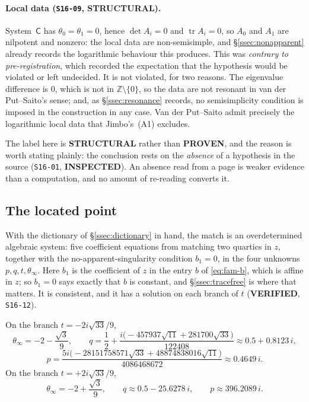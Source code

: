 \paragraph{Local data (\texttt{S16-09}, \textbf{STRUCTURAL}).}
System~$\mathsf C$ has $\theta_0=\theta_1=0$, hence $\det A_i=0$ and
$\operatorname{tr}A_i=0$, so $A_0$ and $A_1$ are nilpotent and nonzero: the
local data are non-semisimple, and \S\ref{ssec:nonapparent} already records the
logarithmic behaviour this produces. This was \emph{contrary to
pre-registration}, which recorded the expectation that the hypothesis would be
violated or left undecided. It is not violated, for two reasons. The eigenvalue
difference is $0$, which is not in $\mathbb Z\setminus\{0\}$, so the data are
not resonant in van der Put--Saito's sense; and, as \S\ref{ssec:resonance}
records, no semisimplicity condition is imposed in the construction in any
case. Van der Put--Saito admit precisely the logarithmic local data that
Jimbo's~(A1) excludes.

The label here is \textbf{STRUCTURAL} rather than \textbf{PROVEN}, and the
reason is worth stating plainly: the conclusion rests on the \emph{absence} of
a hypothesis in the source (\texttt{S16-01}, \textbf{INSPECTED}). An absence
read from a page is weaker evidence than a computation, and no amount of
re-reading converts it.

\subsection{The located point}\label{ssec:located}

With the dictionary of \S\ref{ssec:dictionary} in hand, the match is an
overdetermined algebraic system: five coefficient equations from matching two
quartics in $z$, together with the no-apparent-singularity condition $b_1=0$,
in the four unknowns $p,q,t,\theta_\infty$. Here $b_1$ is the coefficient of
$z$ in the entry $b$ of \eqref{eq:fam-b}, which is affine in $z$; so $b_1=0$
says exactly that $b$ is constant, and \S\ref{ssec:tracefree} is where that
matters.
It is consistent, and it has a
solution on each branch of $t$ (\textbf{VERIFIED}, \texttt{S16-12}).

On the branch $t=-2i\sqrt{33}/9$,
\[
  \theta_\infty=-2-\frac{\sqrt3}{9},\qquad
  q=\frac12+\frac{i\bigl(-457937\sqrt{11}+281700\sqrt{33}\bigr)}{122408}
   \approx 0.5+0.8123\,i,
\]
\[
  p=\frac{5i\bigl(-28151758571\sqrt{33}+48874838016\sqrt{11}\bigr)}
         {4086468672}\approx 0.4649\,i .
\]
On the branch $t=+2i\sqrt{33}/9$,
\[
  \theta_\infty=-2+\frac{\sqrt3}{9},\qquad
  q\approx 0.5-25.6278\,i,\qquad p\approx 396.2089\,i .
\]

